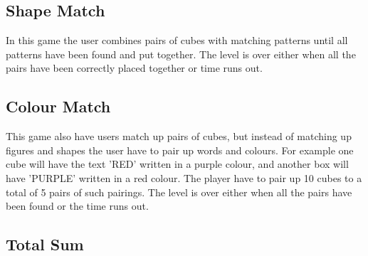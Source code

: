 \subsection{Shape Match}
	\label{game:shape_match} 



In this game the user combines pairs of cubes with matching patterns until all patterns have been found and put together.
The level is over either when all the pairs have been correctly placed together or time runs out.

\subsection{Colour Match}
	\label{game:colour_match}


This game also have users match up pairs of cubes, but instead of matching up figures and shapes the user have to pair up words and colours. For example one cube will have the text 'RED' written in a purple colour, and another box will have 'PURPLE' written in a red colour. The player have to pair up 10 cubes to a total of 5 pairs of such pairings.
The level is over either when all the pairs have been found or the time runs out.

\subsection{Total Sum}
	\label{game:total_sum}



